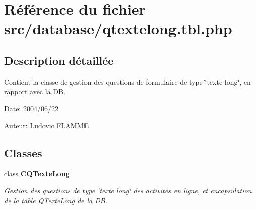 \section{Référence du fichier src/database/qtextelong.tbl.php}
\label{qtextelong_8tbl_8php}


\subsection{Description détaillée}
Contient la classe de gestion des questions de formulaire de type \char`\"{}texte long\char`\"{}, en rapport avec la DB. 

\begin{Desc}
\item[Date:]2004/06/22\end{Desc}
\begin{Desc}
\item[Auteur:]Ludovic FLAMME \end{Desc}


\subsection*{Classes}
\begin{CompactItemize}
\item 
class {\bf CQTexteLong}
\begin{CompactList}\small\item\em Gestion des questions de type \char`\"{}texte long\char`\"{} des activités en ligne, et encapsulation de la table QTexteLong de la DB. \item\end{CompactList}\end{CompactItemize}
